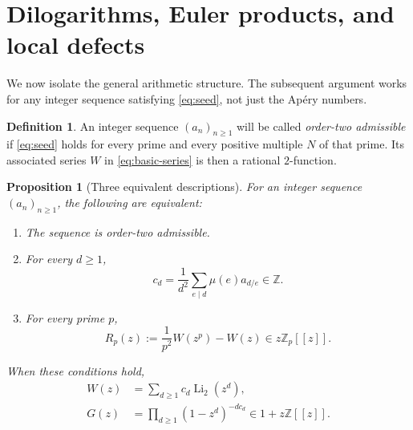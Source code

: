 \documentclass[11pt,letterpaper]{article}
\numberwithin{equation}{section}
\newtheorem{proposition}[proposition]{Proposition}
\theoremstyle{definition}
\newtheorem{definition}[definition]{Definition}
\theoremstyle{remark}
\newcommand{\Z}{\mathbb Z}
\newcommand{\Zp}{\mathbb Z_p}
\newcommand{\Li}{\operatorname{Li}}
\begin{document}
\section{Dilogarithms, Euler products, and local defects}\label{sec:twofunctions}
We now isolate the general arithmetic structure. The subsequent argument
works for any integer sequence satisfying \eqref{eq:seed}, not just the
Ap\'ery numbers.

\begin{definition}
An integer sequence $(a_n)_{n\ge1}$ will be called \emph{order-two
admissible} if \eqref{eq:seed} holds for every prime and every positive
multiple $N$ of that prime. Its associated series $W$ in
\eqref{eq:basic-series} is then a rational $2$-function.
\end{definition}

\begin{proposition}[Three equivalent descriptions]\label{prop:equivalence}
For an integer sequence $(a_n)_{n\ge1}$, the following are equivalent:
\begin{enumerate}[label=\textup{(\roman*)},nosep]
\item The sequence is order-two admissible.
\item For every $d\ge1$,
\begin{equation}\label{eq:cd}
 c_d=\frac1{d^2}\sum_{e\mid d}\mu(e)a_{d/e}\in\Z.
\end{equation}
\item For every prime $p$,
\begin{equation}\label{eq:R}
 R_p(z):=\frac1{p^2}W(z^p)-W(z)\in z\Zp[[z]].
\end{equation}
\end{enumerate}
When these conditions hold,
\begin{align}
 W(z)&=\sum_{d\ge1}c_d\Li_2(z^d),\label{eq:dilog}\\
 G(z)&=\prod_{d\ge1}(1-z^d)^{-dc_d}\in1+z\Z[[z]].\label{eq:euler}
\end{align}
\end{proposition}
\end{document}
